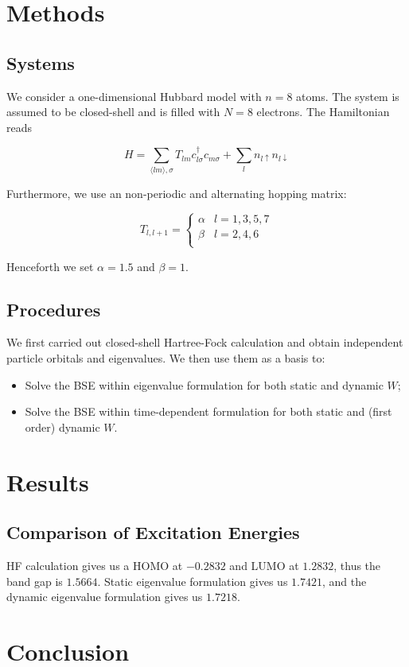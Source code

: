 \documentclass{article}
\begin{document}
\section{Methods}
\subsection{Systems}
We consider a one-dimensional Hubbard model with $n=8$ atoms. The system is assumed to be closed-shell and is filled with $N=8$ electrons. The Hamiltonian reads

$$
H=\sum_{\langle lm\rangle,\sigma}T_{lm}c_{l\sigma}^{\dagger}c_{m\sigma}+ \sum_{l}n_{l\uparrow}n_{l\downarrow}
$$

Furthermore, we use an non-periodic and alternating hopping matrix:

$$
T_{l,l+1}=
\begin{cases}
\alpha&l=1,3,5,7\\
\beta&l=2,4,6\\
\end{cases}
$$

Henceforth we set $\alpha=1.5$ and $\beta=1$.

\subsection{Procedures}
We first carried out closed-shell Hartree-Fock calculation and obtain independent particle orbitals and eigenvalues. We then use them as a basis to:

\begin{itemize}
    \item Solve the BSE within eigenvalue formulation for both static and dynamic $W$;
    \item Solve the BSE within time-dependent formulation for both static and (first order) dynamic $W$.
\end{itemize}

\section{Results}
\subsection{Comparison of Excitation Energies}
HF calculation gives us a HOMO at $-0.2832$ and LUMO at $1.2832$, thus the band gap is $1.5664$. Static eigenvalue formulation gives us $1.7421$, and the dynamic eigenvalue formulation gives us $1.7218$.
\section{Conclusion}
\end{document}
